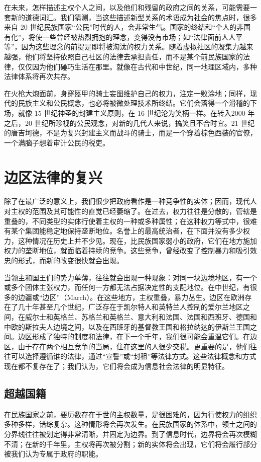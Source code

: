 在未来，怎样描述主权个人之间，以及他们和残留的政府之间的关系，可能需要一套新的道德词汇。我们猜测，当这些描述新型关系的术语成为社会的焦点时，很多来自 20 世纪民族国家“公民”时代的人，会非常生气。国家的终结和“个人的非国有化”，将使一些曾经被热烈拥抱的理念，变得没有市场；如“法律面前人人平等”，因为这些理念的前提是即将被淘汰的权力关系。随着虚拟社区的凝集力越来越强，他们将坚持依照自己社区的法律去承担责任，而不是某个前民族国家的法律，仅仅因为他们碰巧生活在那里。就像在古代和中世纪，同一地理区域内，多种法律体系将再次共存。


在火枪大炮面前，身穿盔甲的骑士妄图维护自己的权力，注定一败涂地；同样，现代的民族主义和公民概念，也必将被微处理技术所终结。它们会落得一个滑稽的下场，就像 15 世纪神圣的封建主义原则，在 16 世纪沦为笑柄一样。在转入2000 年之后，20 世纪所珍视的公民观念，对新的几代人来说，搞笑且不合时宜。21 世纪的唐吉坷德，不是为复兴封建主义而战斗的骑士，而是一个穿着棕色西装的官僚，一个满脑子想着审计公民的税吏。


\section{边区法律的复兴}
除了在最广泛的意义上，我们很少把政府看作是一种竞争性的实体；因而，现代人对主权的范围及其可能性的直觉已经萎缩了。在过去，权力往往是分散的，管辖是重叠的，不同类型的实体行使着主权的一种或多种属性；在这种权力等式中，很难有某个集团能稳定地保持垄断地位。名誉上的最高统治者，在下面并没有多少权力，这种情况在历史上并不少见。现在，比民族国家弱小的政府，它们在地方施加权力的垄断地位，就面临着持续的竞争。这些竞争，曾经改变了控制暴力和吸引效忠的形式，而新的改变很快就会出现。


当领主和国王们的势力单薄，往往就会出现一种现象：对同一块边境地区，有一个或多个团体主张权力，而任何一方都无法占据决定性的支配地位。在中世纪，有很多的边疆或“边区”（March）。在这些地方，主权重叠，暴力丛生。边区在欧洲存在了几十年甚至几个世纪，广泛存在于凯尔特人和英特兰人控制的爱尔兰地区之间，在威尔士和英格兰、苏格兰和英格兰、意大利和法国、法国和西班牙、德国和中欧的斯拉夫人边境之间，以及在西班牙的基督教王国和格拉纳达的伊斯兰王国之间。边区形成了独特的制度和法律，在下一个千年，我们很可能会重温它们。在边区，由于存在两个相互竞争的当局，住在这里的人很少交税。更重要的是，他们往往可以选择遵循谁的法律，通过“宣誓”或“封租”等法律方式。这些法律概念和方式现在都不复存在了；我们认为，它们将会成为信息社会法律的明显特征。


\subsection{超越国籍}
在民族国家之前，要历数存在于世的主权数量，是很困难的，因为行使权力的组织多种多样，错综复杂。这种情形将会再次发生。在民族国家的体系中，领土之间的分界线往往被划定得非常清晰，并固定为边界。到了信息时代，边界将会再次模糊不清；在新的千年里，主权将再次被分割；新的实体将会出现，它们将会履行部分被我们认为专属于政府的职能。


